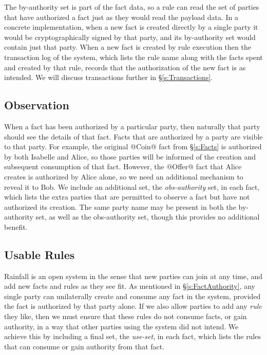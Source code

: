 The by-authority set is part of the fact data, so a rule can read the set of parties that have authorized a fact just as they would read the payload data. In a concrete implementation, when a new fact is created directly by a single party it would be cryptographically signed by that party, and its by-authority set would contain just that party. When a new fact is created by rule execution then the transaction log of the system, which lists the rule name along with the facts spent and created by that rule, records that the authorization of the new fact is as intended. We will discuss transactions further in \S\ref{s:Transactions}.


\subsection{Observation}
\label{s:Observation}
When a fact has been authorized by a particular party, then naturally that party should see the details of that fact. Facts that are authorized by a party are visible to that party. For example, the original @Coin@ fact from \S\ref{s:Facts} is authorized by both Isabelle and Alice, so those parties will be informed of the creation and subsequent consumption of that fact. However, the @Offer@ fact that Alice creates is authorized by Alice alone, so we need an additional mechanism to reveal it to Bob. We include an additional set, the \emph{obs-authority} set, in each fact, which lists the extra parties that are permitted to observe a fact but have not authorized its creation. The same party name may be present in both the by-authority set, as well as the obs-authority set, though this provides no additional benefit.


\subsection{Usable Rules}
Rainfall is an open system in the sense that new parties can join at any time, and add new facts and rules as they see fit. As mentioned in \S\ref{s:FactAuthority}, any single party can unilaterally create and consume any fact in the system, provided the fact is authorized by that party alone. If we also allow parties to add any \emph{rule} they like, then we must ensure that these rules do not consume facts, or gain authority, in a way that other parties using the system did not intend. We achieve this by including a final set, the \emph{use-set}, in each fact, which lists the rules that can consume or gain authority from that fact.

